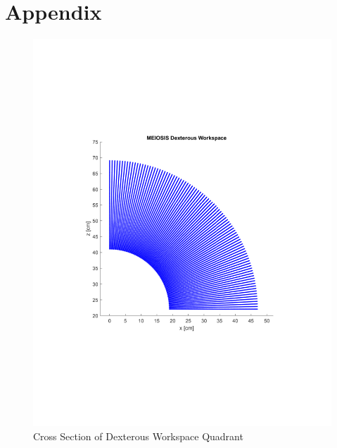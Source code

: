 \documentclass[12pt]{report}
\begin{document}
\section*{Appendix}\label{sec:app}
\begin{figure}[htp]
  \centering
  \includegraphics[frame,width=.75\textwidth]{dex}
  \caption{Cross Section of Dexterous Workspace Quadrant}
  \label{fig:dex}
\end{figure}

\newpage


\end{document}
